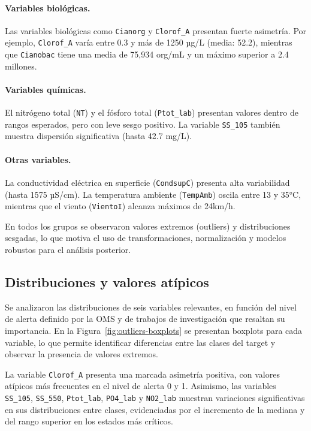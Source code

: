 \documentclass[11pt]{report}
\begin{document}
\paragraph{Variables biológicas.}
Las variables biológicas como \texttt{Cianorg} y \texttt{Clorof\_A} presentan fuerte asimetría. Por ejemplo, \texttt{Clorof\_A} varía entre 0.3 y más de 1250 µg/L (media: 52.2), mientras que \texttt{Cianobac} tiene una media de 75,934 org/mL y un máximo superior a 2.4 millones.

\paragraph{Variables químicas.}
El nitrógeno total (\texttt{NT}) y el fósforo total (\texttt{Ptot\_lab}) presentan valores dentro de rangos esperados, pero con leve sesgo positivo. La variable \texttt{SS\_105} también muestra dispersión significativa (hasta 42.7 mg/L).

\paragraph{Otras variables.}
La conductividad eléctrica en superficie (\texttt{CondsupC}) presenta alta variabilidad (hasta 1575 µS/cm). La temperatura ambiente (\texttt{TempAmb}) oscila entre 13 y 35°C, mientras que el viento (\texttt{VientoI}) alcanza máximos de 24km/h.

En todos los grupos se observaron valores extremos (outliers) y distribuciones sesgadas, lo que motiva el uso de transformaciones, normalización y modelos robustos para el análisis posterior.

\subsection{Distribuciones y valores atípicos}

Se analizaron las distribuciones de seis variables relevantes, en función del nivel de alerta definido por la OMS y de trabajos de investigación que resaltan su importancia. En la Figura~\ref{fig:outliers-boxplots} se presentan boxplots para cada variable, lo que permite identificar diferencias entre las clases del target y observar la presencia de valores extremos.

La variable \texttt{Clorof\_A} presenta una marcada asimetría positiva, con valores atípicos más frecuentes en el nivel de alerta 0 y 1. Asimismo, las variables \texttt{SS\_105}, \texttt{SS\_550}, \texttt{Ptot\_lab}, \texttt{PO4\_lab} y \texttt{NO2\_lab} muestran variaciones significativas en sus distribuciones entre clases, evidenciadas por el incremento de la mediana y del rango superior en los estados más críticos.
\end{document}
